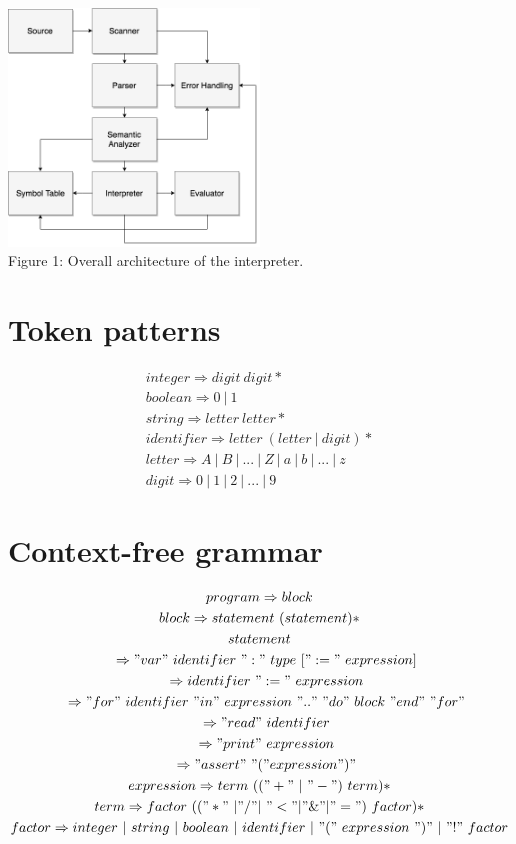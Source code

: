 \documentclass[fleqn]{article}
\begin{document}
{\centering
    \vspace*{1cm} 
    \includegraphics[width=0.5\textwidth]{architecture}
    \\Figure 1: Overall architecture of the interpreter.
    \par
}
 
\newpage
\section{Token patterns}

\begin{gather*}
    integer \Rightarrow digit \ digit* \\
    boolean \Rightarrow 0 \ | \ 1 \\
    string \Rightarrow letter \ letter* \\    
    identifier \Rightarrow letter \ (letter \ | \ digit)* \\
    letter \Rightarrow  A \ | \ B \ | \ . . . \ | \ Z \ | \ a \ | \ b \ | \ . . . \ | \ z \\
    digit \Rightarrow  0 \ | \ 1 \ | \ 2 \ | \ . . . \ | \ 9
\end{gather*}

\section{Context-free grammar}
\begin{gather*}
    program \Rightarrow block \\
    block \Rightarrow statement \ (statement)* \\
    statement \\
    \quad \Rightarrow "var" \ identifier \ ":" \ type \ [ ":=" expression ] \\
    \quad \Rightarrow identifier \ ":=" \ expression \\
    \quad \Rightarrow "for" \ identifier \ "in"  expression \ ".." \ "do" \ block \ "end" \ "for" \\
    \quad \Rightarrow "read" \ identifier \\
    \quad \Rightarrow "print" \ expression \\
    \quad \Rightarrow "assert" \ "(" expression ")" \\
    expression \Rightarrow term \ (("+" \ | \ "-") \ term)* \\
    term \Rightarrow factor \ (("*" \ | "/" | "<" | "\&" | "=") \ factor)*  \\
    factor \Rightarrow integer \ | \ string \ | \ boolean \ | \ identifier \ | "(" \ expression \ ")" \ | \ "!" factor
\end{gather*}
\end{document}
